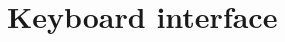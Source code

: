 \documentclass[Orbiter User Manual.tex]{subfiles}
\begin{document}
\section{Keyboard interface}

\end{document}
